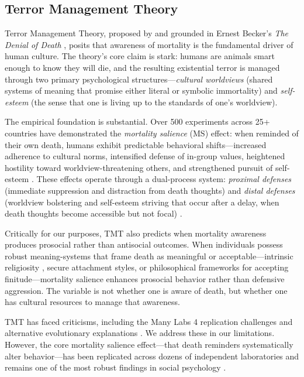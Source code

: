 \documentclass{article}
\begin{document}
\subsection{Terror Management Theory}

Terror Management Theory, proposed by \citet{greenberg1986causes} and grounded in Ernest Becker's \emph{The Denial of Death} \citep{becker1973denial}, posits that awareness of mortality is the fundamental driver of human culture. The theory's core claim is stark: humans are animals smart enough to know they will die, and the resulting existential terror is managed through two primary psychological structures---\emph{cultural worldviews} (shared systems of meaning that promise either literal or symbolic immortality) and \emph{self-esteem} (the sense that one is living up to the standards of one's worldview).

The empirical foundation is substantial. Over 500 experiments across 25+ countries have demonstrated the \emph{mortality salience} (MS) effect: when reminded of their own death, humans exhibit predictable behavioral shifts---increased adherence to cultural norms, intensified defense of in-group values, heightened hostility toward worldview-threatening others, and strengthened pursuit of self-esteem \citep{burke2010two,hayes2010death}. These effects operate through a dual-process system: \emph{proximal defenses} (immediate suppression and distraction from death thoughts) and \emph{distal defenses} (worldview bolstering and self-esteem striving that occur after a delay, when death thoughts become accessible but not focal) \citep{greenberg1994role,pyszczynski2004experimental}.

Critically for our purposes, TMT also predicts when mortality awareness produces prosocial rather than antisocial outcomes. When individuals possess robust meaning-systems that frame death as meaningful or acceptable---intrinsic religiosity \citep{jonas2006terror}, secure attachment styles, or philosophical frameworks for accepting finitude---mortality salience enhances prosocial behavior rather than defensive aggression. The variable is not whether one is aware of death, but whether one has cultural resources to manage that awareness.

TMT has faced criticisms, including the Many Labs 4 replication challenges \citep{klein2022manylabs4} and alternative evolutionary explanations \citep{navarrete2005normative}. We address these in our limitations. However, the core mortality salience effect---that death reminders systematically alter behavior---has been replicated across dozens of independent laboratories and remains one of the most robust findings in social psychology \citep{solomon2015worm,routledge2019handbook}.
\end{document}
